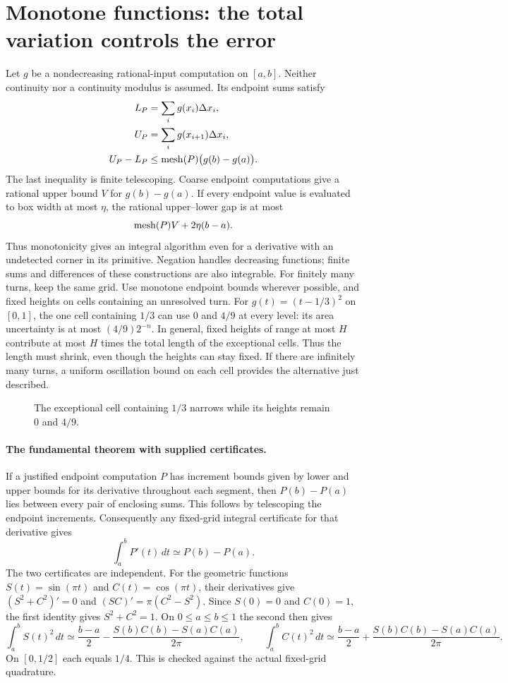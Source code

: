 \section{Monotone functions: the total variation controls the error}
Let $g$ be a nondecreasing rational-input computation on $[a,b]$.  Neither
continuity nor a continuity modulus is assumed.  Its endpoint sums satisfy
\begin{align*}
 L_P&=\sum_i g(x_i)\Delta x_i,\\
 U_P&=\sum_i g(x_{i+1})\Delta x_i,\\
 U_P-L_P&\le\operatorname{mesh}(P)\bigl(g(b)-g(a)\bigr).
\end{align*}
The last inequality is finite telescoping.  Coarse endpoint computations
give a rational upper bound $V$ for $g(b)-g(a)$.  If every endpoint value
is evaluated to box width at most $\eta$, the rational upper--lower gap
is at most
\[
 \operatorname{mesh}(P)V+2\eta(b-a).
\]
Thus monotonicity gives an integral algorithm even for a derivative with
an undetected corner in its primitive.  Negation handles decreasing
functions; finite sums and differences of these constructions are also
integrable.  For finitely many turns, keep the same grid. Use monotone endpoint
bounds wherever possible, and fixed heights on cells containing an
unresolved turn. For $g(t)=(t-1/3)^2$ on $[0,1]$, the one cell
containing $1/3$ can use $0$ and $4/9$ at every level: its area
uncertainty is at most $(4/9)2^{-n}$. In general, fixed heights of
range at most $H$ contribute at most $H$ times the total length of
the exceptional cells. Thus the length must shrink, even though the
heights can stay fixed. If there are infinitely many turns, a uniform
oscillation bound on each cell provides the alternative just described.

\begin{figure}[htbp]\centering
\singleTurnIntegralAnimation
\caption{The exceptional cell containing $1/3$ narrows while its heights remain $0$ and $4/9$.}
\end{figure}

\paragraph{The fundamental theorem with supplied certificates.}
If a justified endpoint computation $P$ has increment bounds given by
lower and upper bounds for its derivative throughout each segment, then
$P(b)-P(a)$ lies between every pair of enclosing sums. This follows by
telescoping the endpoint increments. Consequently any fixed-grid integral
certificate for that derivative gives
\[
\int_a^b P'(t)\,dt\simeq P(b)-P(a).
\]
The two certificates are independent. For the geometric functions
$S(t)=\sin(\pi t)$ and $C(t)=\cos(\pi t)$, their derivatives give
$(S^2+C^2)'=0$ and $(SC)'=\pi(C^2-S^2)$. Since $S(0)=0$ and $C(0)=1$,
the first identity gives $S^2+C^2=1$. On $0\le a\le b\le1$ the second
then gives
\[
\int_a^b S(t)^2\,dt\simeq \frac{b-a}{2}-\frac{S(b)C(b)-S(a)C(a)}{2\pi},
\qquad
\int_a^b C(t)^2\,dt\simeq \frac{b-a}{2}+\frac{S(b)C(b)-S(a)C(a)}{2\pi}.
\]
On $[0,1/2]$ each equals $1/4$. This is checked against the actual
fixed-grid quadrature.

